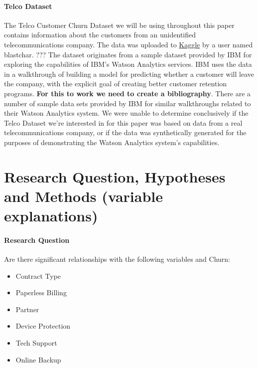 \documentclass[man, floatsintext]{apa6}
\begin{document}
\hspace{0.5mm}

\paragraph{Telco Dataset}

The Telco Customer Churn Dataset we will be using throughout this paper contains information about the customers from an unidentified telecommunications company. The data was uploaded to \href{https://www.kaggle.com/blastchar/telco-customer-churn}{Kaggle} by a user named blastchar. \cite{blastchar_2018} ??? The dataset originates from a sample dataset provided by IBM for exploring the capabilities of IBM's Watson Analytics services. IBM uses the data in a walkthrough of building a model for predicting whether a customer will leave the company, with the explicit goal of creating better customer retention programs. \cite{ibm_telco_2015} \textbf{For this to work we need to create a bibliography}. There are a number of sample data sets provided by IBM for similar walkthroughs related to their Watson Analytics system. \cite{ibm_data_2015} We were unable to determine conclusively if the Telco Dataset we're interested in for this paper was based on data from a real telecommunications company, or if the data was synthetically generated for the purposes of demonstrating the Watson Analytics system's capabilities.

\hspace{0.5mm}

\section{Research Question, Hypotheses and Methods (variable explanations)}
\paragraph{Research Question}

Are there significant relationships with the following variables and Churn:
\begin{itemize}
\item{Contract Type}
\item{Paperless Billing}
\item{Partner}
\item{Device Protection}
\item{Tech Support}
\item{Online Backup}
\end{itemize}
\end{document}
